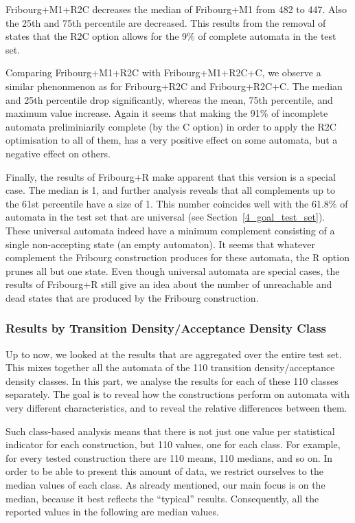 Fribourg+M1+R2C decreases the median of Fribourg+M1 from 482 to 447. Also the 25th and 75th percentile are decreased. This results from the removal of states that the R2C option allows for the 9\% of complete automata in the \goal{} test set.

Comparing Fribourg+M1+R2C with Fribourg+M1+R2C+C, we observe a similar phenonmenon as for Fribourg+R2C and Fribourg+R2C+C. The median and 25th percentile drop significantly, whereas the mean, 75th percentile, and maximum value increase. Again it seems that making the 91\% of incomplete automata preliminiarily complete (by the C option) in order to apply the R2C optimisation to all of them, has a very positive effect on some automata, but a negative effect on others.

Finally, the results of Fribourg+R make apparent that this version is a special case. The median is 1, and further analysis reveals that all complements up to the 61st percentile have a size of 1. This number coincides well with the 61.8\% of automata in the \goal{} test set that are universal (see Section~\ref{4_goal_test_set}). These universal automata indeed have a minimum complement consisting of a single non-accepting state (an empty automaton). It seems that whatever complement the Fribourg construction produces for these automata, the R option prunes all but one state. Even though universal automata are special cases, the results of Fribourg+R still give an idea about the number of unreachable and dead states that are produced by the Fribourg construction.

\subsubsection{Results by Transition Density/Acceptance Density Class}
Up to now, we looked at the results that are aggregated over the entire test set. This mixes together all the automata of the 110 transition density/acceptance density classes. In this part, we analyse the results for each of these 110 classes separately. The goal is to reveal how the constructions perform on automata with very different characteristics, and to reveal the relative differences between them.

Such class-based analysis means that there is not just one value per statistical indicator for each construction, but 110 values, one for each class. For example, for every tested construction there are 110 means, 110 medians, and so on. In order to be able to present this amount of data, we restrict ourselves to the median values of each class. As already mentioned, our main focus is on the median, because it best reflects the ``typical'' results. Consequently, all the reported values in the following are median values. 


